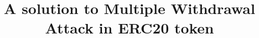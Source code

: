 \documentclass[compsoc, conference, letterpaper, 10pt, times]{IEEEtran}
\begin{document}
\title{A solution to Multiple Withdrawal Attack in ERC20 token}
\author{
	\IEEEauthorblockN{                  }
	\IEEEauthorblockA{                  }
}

\maketitle
\IEEEpubidadjcol

\IEEEpeerreviewmaketitle







\footnotesize

\end{document}
